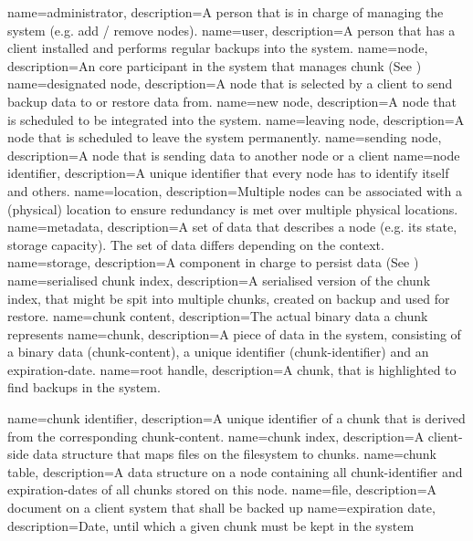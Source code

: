 {
    name={administrator},
    description={A person that is in charge of managing the system (e.g. add / remove nodes).}
}
{
    name={user},
    description={A person that has a \gls{client} installed and performs regular backups into the system.}
}
{
    name={node},
    description={An core participant in the system that manages \gls{chunk} (See )}
}
{
    name={designated node},
    description={A \gls{node} that is selected by a \gls{client} to send backup data to or restore data from.}
}
{
    name={new node},
    description={A \gls{node} that is scheduled to be integrated into the system.}
}
{
    name={leaving node},
    description={A \gls{node} that is scheduled to leave the system permanently.}
}
{
    name={sending node},
    description={A \gls{node} that is sending data to another node or a client}
}
{
    name={node identifier},
    description={A unique identifier that every node has to identify itself and others.}
}
{
    name={location},
    description={Multiple nodes can be associated with a (physical) location to ensure redundancy is met over multiple physical locations.}
}
{
    name={metadata},
    description={A set of data that describes a node (e.g. its state, storage capacity). The set of data differs depending on the context.}
}
{
    name={storage},
    description={A component in charge to persist data (See )}
}
{
    name={serialised chunk index},
    description={A serialised version of the chunk index, that might be spit into multiple chunks, created on backup and used for restore.}
}
{
    name={chunk content},
    description={The actual binary data a chunk represents}
}
{
    name={chunk},
    description={A piece of data in the system, consisting of a binary data (\gls{chunk-content}), a unique identifier (\gls{chunk-identifier}) and an \gls{expiration-date}.}
}
{
    name={root handle},
    description={A chunk, that is highlighted to find backups in the system.}
}

{
    name={chunk identifier},
    description={A unique identifier of a \gls{chunk} that is derived from the corresponding \gls{chunk-content}.}
}
{
    name={chunk index},
    description={A \gls{client}-side data structure that maps files on the filesystem to chunks.}
}
{
    name={chunk table},
    description={A data structure on a \gls{node} containing all \gls{chunk-identifier} and \glspl{expiration-date} of all \glspl{chunk} stored on this \gls{node}.}
}
{
    name={file},
    description={A document on a client system that shall be backed up}
}
{
    name={expiration date},
    description={Date, until which a given \gls{chunk} must be kept in the system}
}


